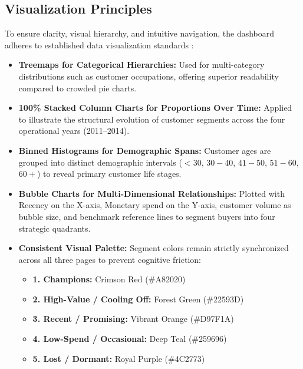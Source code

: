 \subsection{Visualization Principles}
\label{subsec:bi_principles}
To ensure clarity, visual hierarchy, and intuitive navigation, the dashboard adheres to established data visualization standards \parencite{wilke2019fundamentals}:
\begin{itemize}
    \item \textbf{Treemaps for Categorical Hierarchies:} Used for multi-category distributions such as customer occupations, offering superior readability compared to crowded pie charts.
    \item \textbf{100\% Stacked Column Charts for Proportions Over Time:} Applied to illustrate the structural evolution of customer segments across the four operational years (2011--2014).
    \item \textbf{Binned Histograms for Demographic Spans:} Customer ages are grouped into distinct demographic intervals ($<30$, $30-40$, $41-50$, $51-60$, $60+$) to reveal primary customer life stages.
    \item \textbf{Bubble Charts for Multi-Dimensional Relationships:} Plotted with Recency on the X-axis, Monetary spend on the Y-axis, customer volume as bubble size, and benchmark reference lines to segment buyers into four strategic quadrants.
    \item \textbf{Consistent Visual Palette:} Segment colors remain strictly synchronized across all three pages to prevent cognitive friction:
    \begin{itemize}
        \item \textcolor[rgb]{0.70, 0.13, 0.13}{\textbf{1. Champions:}} Crimson Red (\#A82020)
        \item \textcolor[rgb]{0.13, 0.35, 0.24}{\textbf{2. High-Value / Cooling Off:}} Forest Green (\#22593D)
        \item \textcolor[rgb]{0.85, 0.50, 0.10}{\textbf{3. Recent / Promising:}} Vibrant Orange (\#D97F1A)
        \item \textcolor[rgb]{0.15, 0.60, 0.60}{\textbf{4. Low-Spend / Occasional:}} Deep Teal (\#259696)
        \item \textcolor[rgb]{0.30, 0.15, 0.45}{\textbf{5. Lost / Dormant:}} Royal Purple (\#4C2773)
    \end{itemize}
\end{itemize}

